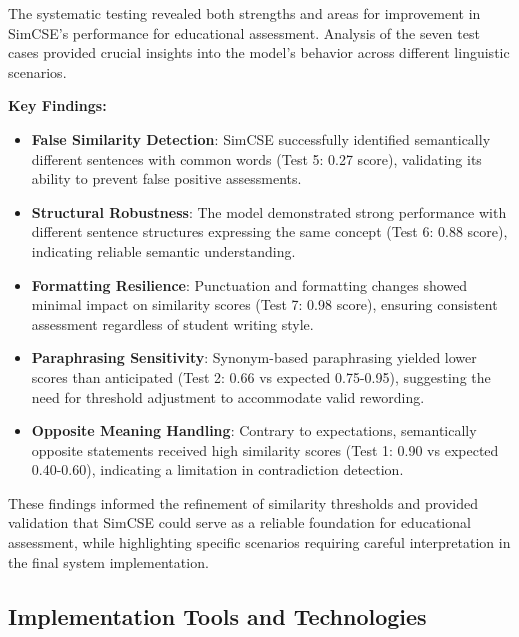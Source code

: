 {\color{maroon}
The systematic testing revealed both strengths and areas for improvement in SimCSE's performance for educational assessment. Analysis of the seven test cases provided crucial insights into the model's behavior across different linguistic scenarios.

\textbf{Key Findings:}
\begin{itemize}
    \item \textbf{False Similarity Detection}: SimCSE successfully identified semantically different sentences with common words (Test 5: 0.27 score), validating its ability to prevent false positive assessments.
    
    \item \textbf{Structural Robustness}: The model demonstrated strong performance with different sentence structures expressing the same concept (Test 6: 0.88 score), indicating reliable semantic understanding.
    
    \item \textbf{Formatting Resilience}: Punctuation and formatting changes showed minimal impact on similarity scores (Test 7: 0.98 score), ensuring consistent assessment regardless of student writing style.
    
    \item \textbf{Paraphrasing Sensitivity}: Synonym-based paraphrasing yielded lower scores than anticipated (Test 2: 0.66 vs expected 0.75-0.95), suggesting the need for threshold adjustment to accommodate valid rewording.
    
    \item \textbf{Opposite Meaning Handling}: Contrary to expectations, semantically opposite statements received high similarity scores (Test 1: 0.90 vs expected 0.40-0.60), indicating a limitation in contradiction detection.
\end{itemize}

These findings informed the refinement of similarity thresholds and provided validation that SimCSE could serve as a reliable foundation for educational assessment, while highlighting specific scenarios requiring careful interpretation in the final system implementation.
}

\subsection{Implementation Tools and Technologies}

